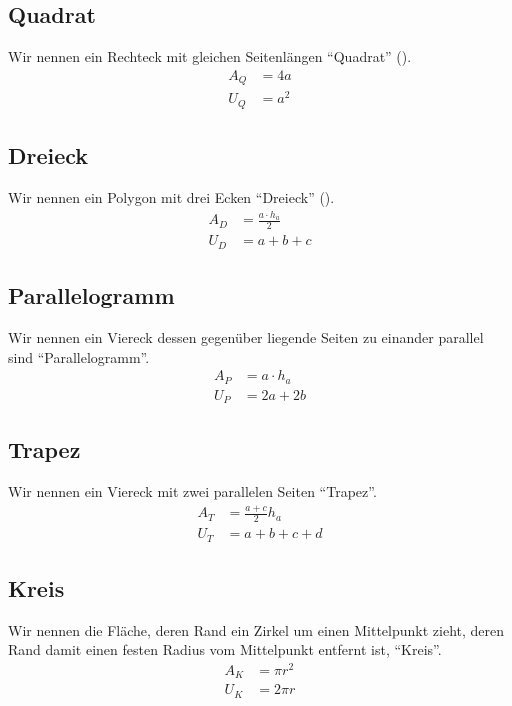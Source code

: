 \documentclass[a4paper]{book}%
\theoremstyle{definition}
\begin{document}
\subsection{Quadrat}\label{fs:Quadrat}

Wir nennen ein Rechteck mit gleichen Seitenlängen \enquote{Quadrat} ().
\begin{align}\label{eqn:fsQuadrat}
  A_Q &= 4a \\
  U_Q &= a^2
\end{align}


\subsection{Dreieck}\label{fs:Dreieck}

Wir nennen ein Polygon mit drei Ecken \enquote{Dreieck} ().
\begin{align}\label{eqn:fsDreieck}
  A_D &= \frac{a \cdot h_a}{2} \\
  U_D &= a+b+c
\end{align}


\subsection{Parallelogramm}

Wir nennen ein Viereck dessen gegenüber liegende Seiten zu einander parallel sind \enquote{Parallelogramm}.
\begin{align}\label{eqn:fsPrallelogramm}
  A_P &= a \cdot h_a \\
  U_P &= 2a + 2b
\end{align}

\subsection{Trapez}

Wir nennen ein Viereck mit zwei parallelen Seiten \enquote{Trapez}.
\begin{align}\label{eqn:fsTrapez}
  A_T &= \frac{a+c}{2} h_a \\
  U_T &= a+b+c+d
\end{align}


\subsection{Kreis}

Wir nennen die Fläche, deren Rand ein Zirkel um einen Mittelpunkt zieht, deren Rand damit einen festen Radius vom Mittelpunkt entfernt ist, \enquote{Kreis}.
\begin{align}\label{eqn:fsKreis}
  A_K &= \pi r^2 \\
  U_K &= 2 \pi r
\end{align}
\end{document}
